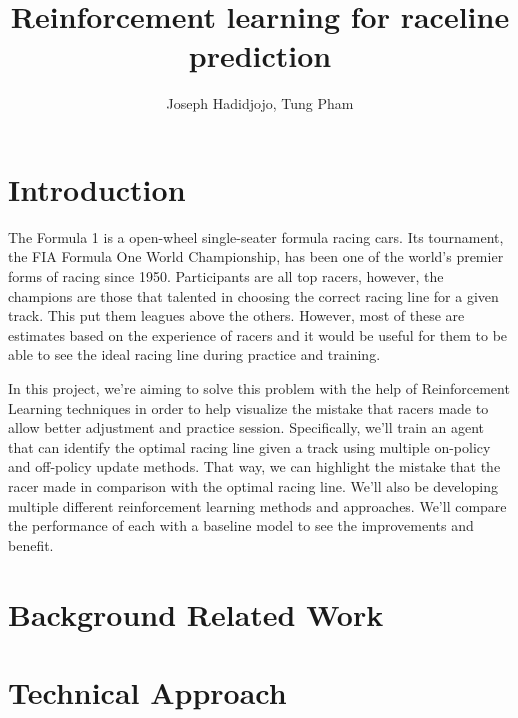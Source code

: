 \documentclass{article}
\title{Reinforcement learning for raceline prediction}
\author{Joseph Hadidjojo, Tung Pham}
\date{\vspace{-1em}}
\begin{document}
\maketitle


\section{Introduction}

The Formula 1 is a open-wheel single-seater formula racing cars. Its tournament,
the FIA Formula One World Championship, has been one of the world's premier forms of racing since 1950.
Participants are all top racers, however, the champions are those that talented
in choosing the correct racing line for a given track. This put them
leagues above the others. However, most of these are estimates based on the
experience of racers and it would be useful for them to be able to see the ideal
racing line during practice and training.

In this project, we're aiming to solve this problem with the help of
Reinforcement Learning techniques in order to help visualize the mistake that
racers made to allow better adjustment and practice session. Specifically, we'll
train an agent that can identify the optimal racing line given a track using
multiple on-policy and off-policy update methods. That way, we can highlight the
mistake that the racer made in comparison with the optimal racing line. We'll
also be developing multiple different reinforcement learning methods and
approaches. We'll compare the performance of each with a baseline model to see
the improvements and benefit.

\section{Background Related Work}

\section{Technical Approach}
\end{document}
